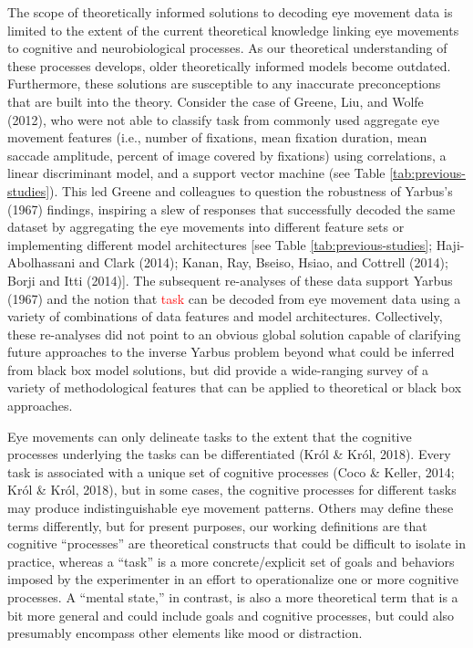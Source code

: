 \documentclass[
  english,
  man, donotrepeattitle,floatsintext]{apa6}
\begin{document}
The scope of theoretically informed solutions to decoding eye movement data is limited to the extent of the current theoretical knowledge linking eye movements to cognitive and neurobiological processes. As our theoretical understanding of these processes develops, older theoretically informed models become outdated. Furthermore, these solutions are susceptible to any inaccurate preconceptions that are built into the theory. Consider the case of Greene, Liu, and Wolfe (2012), who were not able to classify task from commonly used aggregate eye movement features (i.e., number of fixations, mean fixation duration, mean saccade amplitude, percent of image covered by fixations) using correlations, a linear discriminant model, and a support vector machine (see Table \ref{tab:previous-studies}). This led Greene and colleagues to question the robustness of Yarbus's (1967) findings, inspiring a slew of responses that successfully decoded the same dataset by aggregating the eye movements into different feature sets or implementing different model architectures {[}see Table \ref{tab:previous-studies}; Haji-Abolhassani and Clark (2014); Kanan, Ray, Bseiso, Hsiao, and Cottrell (2014); Borji and Itti (2014){]}. The subsequent re-analyses of these data support Yarbus (1967) and the notion that \textcolor{red}{task} can be decoded from eye movement data using a variety of combinations of data features and model architectures. Collectively, these re-analyses did not point to an obvious global solution capable of clarifying future approaches to the inverse Yarbus problem beyond what could be inferred from black box model solutions, but did provide a wide-ranging survey of a variety of methodological features that can be applied to theoretical or black box approaches.

Eye movements can only delineate tasks to the extent that the cognitive processes underlying the tasks can be differentiated (Król \& Król, 2018). Every task is associated with a unique set of cognitive processes (Coco \& Keller, 2014; Król \& Król, 2018), but in some cases, the cognitive processes for different tasks may produce indistinguishable eye movement patterns. Others may define these terms differently, but for present purposes, our working definitions are that cognitive ``processes'' are theoretical constructs that could be difficult to isolate in practice, whereas a ``task'' is a more concrete/explicit set of goals and behaviors imposed by the experimenter in an effort to operationalize one or more cognitive processes. A ``mental state,'' in contrast, is also a more theoretical term that is a bit more general and could include goals and cognitive processes, but could also presumably encompass other elements like mood or distraction.
\end{document}
